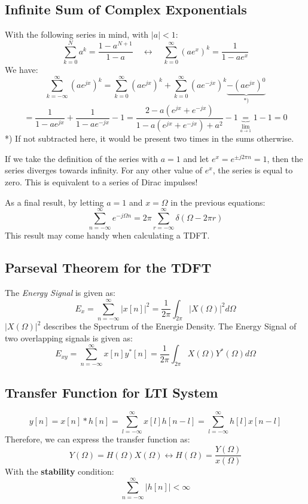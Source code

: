 \documentclass[10pt,a4paper]{article}
\begin{document}
\subsection{Infinite Sum of Complex Exponentials}
With the following series in mind, with $\vert a \vert < 1$: 
$$
\sum_{k=0}^{N} a^k = \frac{1 - a^{N+1}}{1 - a}
\quad \longleftrightarrow \quad 
\sum_{k=0}^{\infty} (ae^{x})^k = \frac{1}{1 - ae^x}
$$
We have:
$$
\sum_{k=-\infty}^{\infty} (ae^{jx})^k = \sum_{k=0}^{\infty} (ae^{jx})^k + 
										\sum_{k=0}^{\infty} (ae^{-jx})^k 
									   	\underbrace{-(ae^{jx})^0}_{\text{*)}}
$$
$$
 = \frac{1}{1-ae^{jx}} + \frac{1}{1-ae^{-jx}} - 1 
 = \frac{2 - a(e^{jx}+e^{-jx})}{1 - a(e^{jx}+e^{-jx}) + a^2} - 1
 \underbrace{=}_{\lim_{a \to 1}} 1 - 1 = 0
$$
*) If not subtracted here, it would be present two times in the sums otherwise. 

If we take the definition of the series with $a = 1$ and let $e^x = e^{\pm j 2 \pi n} = 1$, then the series diverges towards infinity. For any other value of $e^x$, the series is equal to zero. This is equivalent to a series of Dirac impulses!

As a final result, by letting $a=1$ and $x=\Omega$ in the previous equations:
$$
\boxed{
\sum_{n=-\infty}^{\infty} e^{-j \Omega n} = 2\pi \sum_{r=-\infty}^{\infty} \delta(\Omega - 2\pi r)
}
$$
This result may come handy when calculating a TDFT. 


\subsection{Parseval Theorem for the TDFT}
The \textit{Energy Signal} is given as: 
$$
E_x = \sum_{n=-\infty}^{\infty} \vert x[n] \vert^2 = \frac{1}{2\pi} \int_{2\pi} \vert X(\Omega) \vert^2 d\Omega
$$
$\vert X(\Omega) \vert^2$ describes the Spectrum of the Energie Density. The Energy Signal of two overlapping signals is given as: 
$$
E_{xy} = \sum_{n=-\infty}^{\infty} x[n]y^*[n] = \frac{1}{2\pi} \int_{2\pi} X(\Omega)Y^*(\Omega) d\Omega
$$

\subsection{Transfer Function for LTI System}
$$
y[n] = x[n]*h[n] = \sum_{l=-\infty}^{\infty}{x[l]h[n-l]}
				 = \sum_{l=-\infty}^{\infty}{h[l]x[n-l]}
$$
Therefore, we can express the transfer function as:
$$
Y(\Omega) = H(\Omega)X(\Omega) \leftrightarrow 
\boxed{H(\Omega) = \frac{Y(\Omega)}{x(\Omega)}}
$$
With the \textbf{stability} condition:
$$
\boxed{ \sum_{n=-\infty}^{\infty} \vert h[n]\vert < \infty }
$$
\end{document}
